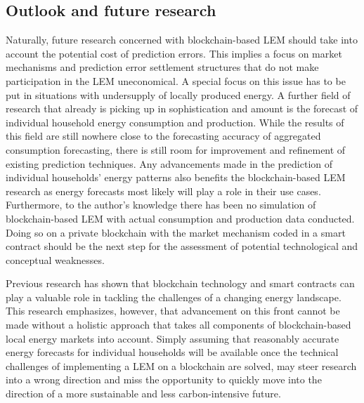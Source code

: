 \subsection{Outlook and future research}\label{Sec:Conclusion;Subsec:Outlook}

Naturally, future research concerned with blockchain-based LEM should take into account the potential cost of prediction errors. This implies a focus on market mechanisms and prediction error settlement structures that do not make participation in the LEM uneconomical. A special focus on this issue has to be put in situations with undersupply of locally produced energy. A further field of research that already is picking up in sophistication and amount is the forecast of individual household energy consumption and production. While the results of this field are still nowhere close to the forecasting accuracy of aggregated consumption forecasting, there is still room for improvement and refinement of existing prediction techniques. Any advancements made in the prediction of individual households' energy patterns also benefits the blockchain-based LEM research as energy forecasts most likely will play a role in their use cases. Furthermore, to the author's knowledge there has been no simulation of blockchain-based LEM with actual consumption and production data conducted. Doing so on a private blockchain with the market mechanism coded in a smart contract should be the next step for the assessment of potential technological and conceptual weaknesses.

Previous research has shown that blockchain technology and smart contracts can play a valuable role in tackling the challenges of a changing energy landscape. This research emphasizes, however, that advancement on this front cannot be made without a holistic approach that takes all components of blockchain-based local energy markets into account. Simply assuming that reasonably accurate energy forecasts for individual households will be available once the technical challenges of implementing a LEM on a blockchain are solved, may steer research into a wrong direction and miss the opportunity to quickly move into the direction of a more sustainable and less carbon-intensive future.


